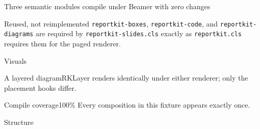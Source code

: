 \begin{frame}
\begin{evidenceslide}{Three semantic modules compile under Beamer with zero changes}
\begin{principle}{Reused, not reimplemented}
\texttt{reportkit-boxes}, \texttt{reportkit-code}, and \texttt{reportkit-diagrams} are
required by \texttt{reportkit-slides.cls} exactly as \texttt{reportkit.cls} requires
them for the paged renderer.
\end{principle}
\end{evidenceslide}
\end{frame}

\begin{frame}[plain]
\begin{sectiondivider}{Visuals}
\end{sectiondivider}
\end{frame}

\begin{frame}
\begin{visualtext}[right]{A layered diagram}{RKLayer renders identically under
either renderer; only the placement hooks differ.}
\begin{diagram}[
  type=layer,
  caption={System layers, top to bottom.},
  source={Illustrative architecture.},
  description={Three stacked layers: presentation, application logic, and data storage.}
]
\end{diagram}
\end{visualtext}
\end{frame}

\begin{frame}
\begin{fullvisual}
\begin{metric}{Compile coverage}{100\%}
Every composition in this fixture appears exactly once.
\end{metric}
\end{fullvisual}
\end{frame}

\begin{frame}[plain]
\begin{sectiondivider}{Structure}
\end{sectiondivider}
\end{frame}

